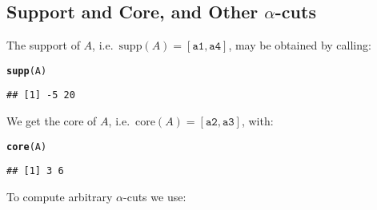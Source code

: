 \documentclass[11pt]{article}\usepackage[]{graphicx}\usepackage[]{color}
\makeatletter
\newcommand{\hlstd}[1]{\textcolor[rgb]{0.345,0.345,0.345}{#1}}%
\newcommand{\hlkwd}[1]{\textcolor[rgb]{0.737,0.353,0.396}{\textbf{#1}}}%
\newenvironment{kframe}{%
 \def\at@end@of@kframe{}%
 \ifinner\ifhmode%
  \def\at@end@of@kframe{\end{minipage}}%
  \begin{minipage}{\columnwidth}%
 \fi\fi%
 \def\FrameCommand##1{\hskip\@totalleftmargin \hskip-\fboxsep
 \colorbox{shadecolor}{##1}\hskip-\fboxsep
     \hskip-\linewidth \hskip-\@totalleftmargin \hskip\columnwidth}%
 \MakeFramed {\advance\hsize-\width
   \@totalleftmargin\z@ \linewidth\hsize
   \@setminipage}}%
 {\par\unskip\endMakeFramed%
 \at@end@of@kframe}
\newenvironment{knitrout}{}{} %
\makeatother
\begin{document}
\subsection{Support and Core, and Other $\alpha$-cuts}

The support of $A$, i.e.~$\mathrm{supp}(A)=[\mathtt{a1}, \mathtt{a4}]$,
may be obtained by calling:

\begin{knitrout}\small
{}\color{fgcolor}\begin{kframe}
\begin{alltt}
\hlkwd{supp}\hlstd{(A)}
\end{alltt}
\begin{verbatim}
## [1] -5 20
\end{verbatim}
\end{kframe}
\end{knitrout}

\noindent
We get the core of $A$, i.e.~$\mathrm{core}(A)=[\mathtt{a2}, \mathtt{a3}]$,
with:

\begin{knitrout}\small
{}\color{fgcolor}\begin{kframe}
\begin{alltt}
\hlkwd{core}\hlstd{(A)}
\end{alltt}
\begin{verbatim}
## [1] 3 6
\end{verbatim}
\end{kframe}
\end{knitrout}

\noindent
To compute arbitrary $\alpha$-cuts we use:
\end{document}
